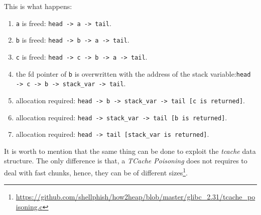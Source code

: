 \documentclass{article}
\numberwithin{equation}{subsection}
\begin{document}
This is what happens:
\begin{enumerate}
    \item \texttt{a} is freed: \texttt{head -> a -> tail}.
    \item \texttt{b} is freed: \texttt{head -> b -> a -> tail}.
    \item \texttt{c} is freed: \texttt{head -> c ->  b -> a -> tail}.
    \item the fd pointer of \texttt{b} is overwritten with the address of the stack variable:\newline\texttt{head -> c ->  b -> stack\_var -> tail}.
    \item allocation required: \newline\texttt{head ->  b -> stack\_var -> tail [c is returned]}.
    \item allocation required: \texttt{head -> stack\_var -> tail [b is returned]}.
    \item allocation required: \texttt{head -> tail [stack\_var is returned]}.
\end{enumerate}
\noindent
It is worth to mention that the same thing can be done to exploit the \emph{tcache} data structure. The only difference is that, a \emph{TCache Poisoning} does not requires to deal with fast chunks, hence, they can be of different sizes\footnote{\href{https://github.com/shellphish/how2heap/blob/master/glibc_2.31/tcache_poisoning.c}{https://github.com/shellphish/how2heap/blob/master/glibc\_2.31/tcache\_poisoning.c}}.
\end{document}
